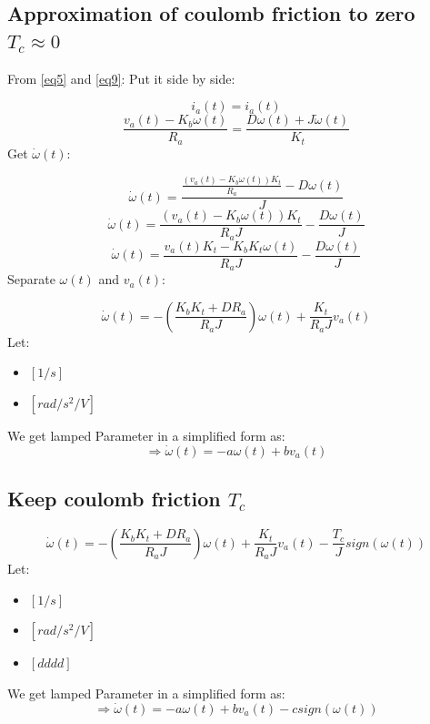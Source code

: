 \documentclass[12pt,a4paper]{article}
\begin{document}
	\subsection{Approximation of coulomb friction to zero \(T_c \approx 0\)}
	
	From \autoref{eq5} and \autoref{eq9}: Put it side by side:
	
	\[i_a(t) = i_a(t)\]
	\[\frac{v_a(t) - K_b \omega(t)}{R_a} = \frac{D\omega(t) + J \dot{\omega}(t)}{K_t}\]
	Get \(\dot{\omega}(t)\):
	
	\[\dot{\omega}(t) = \frac{\frac{(v_a(t) - K_b \omega(t))K_t}{R_a} - D\omega(t)}{J}\]
	\[\dot{\omega}(t) = \frac{(v_a(t) - K_b \omega(t))K_t}{R_a J} - \frac{D\omega(t)}{J}\]
	\[\dot{\omega}(t) = \frac{v_a(t) K_t - K_b K_t\omega(t)}{R_a J} - \frac{D\omega(t)}{J}\]
	Separate \(\omega(t)\) and \(v_a(t)\):
	
	\begin{equation}
		\boxed{\dot{\omega}(t) = - (\frac{K_b K_t + D R_a}{R_a J})\omega(t) + \frac{K_t}{R_a J}v_a(t)}
		\label{eq11}
	\end{equation}
	Let:
	\begin{itemize}
		\item { \([1/s]\) }
		\item { \([rad/s^2/V]\) }
	\end{itemize}
	We get lamped Parameter in a simplified form as:
	\begin{equation}
		\Rightarrow \boxed{\dot{\omega}(t) = - a\omega(t) + bv_a(t)}
		\label{eq12}
	\end{equation}
	
	
	\subsection{Keep coulomb friction \(T_c\)}
	\begin{equation}
		\boxed{\dot{\omega}(t) = - (\frac{K_b K_t + D R_a}{R_a J})\omega(t) + \frac{K_t}{R_a J}v_a(t) - \frac{T_c}{J}sign(\omega(t))}
		\label{eq13}
	\end{equation}
	Let:
	\begin{itemize}
		\item { \([1/s]\) }
		\item { \([rad/s^2/V]\) }
		\item { \([dddd]\) }
	\end{itemize}
	We get lamped Parameter in a simplified form as:
	\begin{equation}
		\Rightarrow \boxed{\dot{\omega}(t) = - a\omega(t) + bv_a(t) - csign(\omega(t))}
		\label{eq14}
	\end{equation}
	
\end{document}
